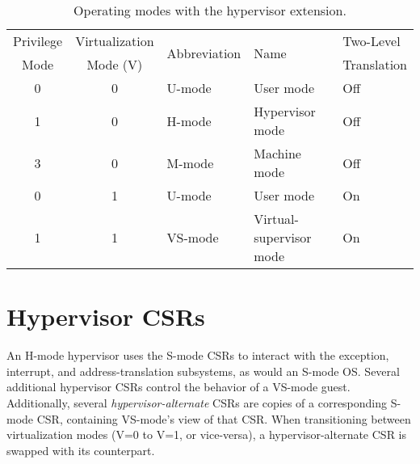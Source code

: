 \begin{table*}[h!]
\begin{center}
\begin{tabular}{|c|c||l|l|l|}
  \hline
   Privilege & Virtualization & \multirow{2}{*}{Abbreviation} & \multirow{2}{*}{Name} & Two-Level \\
   Mode      & Mode (V)       &                               &                       & Translation \\ \hline
   0         & 0              & U-mode  & User mode & Off \\
   1         & 0              & H-mode  & Hypervisor mode & Off \\
   3         & 0              & M-mode  & Machine mode & Off \\
   0         & 1              & U-mode  & User mode & On \\
   1         & 1              & VS-mode & Virtual-supervisor mode & On \\
  \hline
 \end{tabular}
\end{center}
\caption{Operating modes with the hypervisor extension.}
\label{h-operating-modes}
\end{table*}

\section{Hypervisor CSRs}

An H-mode hypervisor uses the S-mode CSRs to interact with the exception,
interrupt, and address-translation subsystems, as would an S-mode OS.
Several additional hypervisor CSRs control the behavior of a VS-mode guest.
Additionally, several {\em hypervisor-alternate} CSRs are copies of
a corresponding S-mode CSR, containing VS-mode's view of that CSR.
When transitioning between virtualization modes (V=0 to V=1, or vice-versa),
a hypervisor-alternate CSR is swapped with its counterpart.
